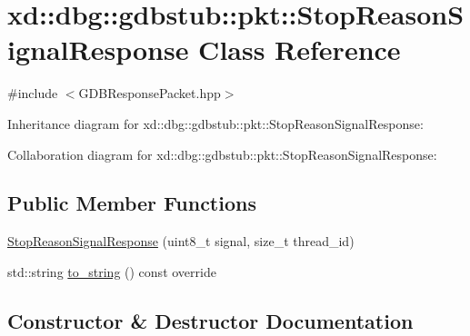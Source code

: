 \hypertarget{classxd_1_1dbg_1_1gdbstub_1_1pkt_1_1_stop_reason_signal_response}{}\section{xd\+:\+:dbg\+:\+:gdbstub\+:\+:pkt\+:\+:Stop\+Reason\+Signal\+Response Class Reference}
\label{classxd_1_1dbg_1_1gdbstub_1_1pkt_1_1_stop_reason_signal_response}


{\ttfamily \#include $<$G\+D\+B\+Response\+Packet.\+hpp$>$}



Inheritance diagram for xd\+:\+:dbg\+:\+:gdbstub\+:\+:pkt\+:\+:Stop\+Reason\+Signal\+Response\+:


Collaboration diagram for xd\+:\+:dbg\+:\+:gdbstub\+:\+:pkt\+:\+:Stop\+Reason\+Signal\+Response\+:
\subsection*{Public Member Functions}
\begin{DoxyCompactItemize}
\item 
\mbox{\hyperlink{classxd_1_1dbg_1_1gdbstub_1_1pkt_1_1_stop_reason_signal_response_a420638fd56146c7325a030b20d811cda}{Stop\+Reason\+Signal\+Response}} (uint8\+\_\+t signal, size\+\_\+t thread\+\_\+id)
\item 
std\+::string \mbox{\hyperlink{classxd_1_1dbg_1_1gdbstub_1_1pkt_1_1_stop_reason_signal_response_a5aa0a7ea7ee15f287165fae5f29c84e8}{to\+\_\+string}} () const override
\end{DoxyCompactItemize}


\subsection{Constructor \& Destructor Documentation}
\mbox{\label{classxd_1_1dbg_1_1gdbstub_1_1pkt_1_1_stop_reason_signal_response_a420638fd56146c7325a030b20d811cda}} 
